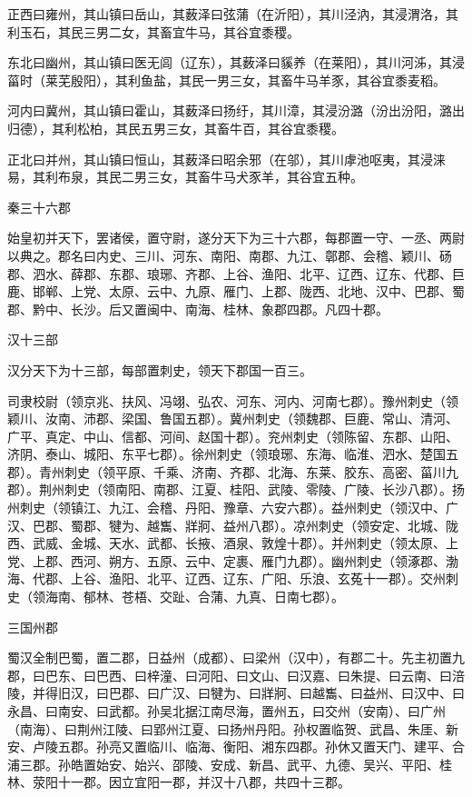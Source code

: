 \documentclass[a4paper,12pt,UTF8,twoside]{ctexbook}
\begin{document}
	正西曰雍州，其山镇曰岳山，其薮泽曰弦蒲（在沂阳），其川泾汭，其浸渭洛，其利玉石，其民三男二女，其畜宜牛马，其谷宜黍稷。
	
	东北曰幽州，其山镇曰医无闾（辽东），其薮泽曰貕养（在莱阳），其川河泲，其浸菑时（莱芜殷阳），其利鱼盐，其民一男三女，其畜牛马羊豕，其谷宜黍麦稻。
	
	河内曰冀州，其山镇曰霍山，其薮泽曰扬纡，其川漳，其浸汾潞（汾出汾阳，潞出归德），其利松柏，其民五男三女，其畜牛百，其谷宜黍稷。
	
	正北曰并州，其山镇曰恒山，其薮泽曰昭余邪（在邬），其川虖池呕夷，其浸涞易，其利布泉，其民二男三女，其畜牛马犬豕羊，其谷宜五种。
	
	秦三十六郡
	
	始皇初并天下，罢诸侯，置守尉，遂分天下为三十六郡，每郡置一守、一丞、两尉以典之。郡名曰内史、三川、河东、南阳、南郡、九江、鄣郡、会稽、颖川、砀郡、泗水、薛郡、东郡、琅琊、齐郡、上谷、渔阳、北平、辽西、辽东、代郡、巨鹿、邯郸、上党、太原、云中、九原、雁门、上郡、陇西、北地、汉中、巴郡、蜀郡、黔中、长沙。后又置闽中、南海、桂林、象郡四郡。凡四十郡。
	
	汉十三部
	
	汉分天下为十三部，每部置刺史，领天下郡国一百三。
	
	司隶校尉（领京兆、扶风、冯翊、弘农、河东、河内、河南七郡）。豫州刺史（领颖川、汝南、沛郡、梁国、鲁国五郡）。冀州刺史（领魏郡、巨鹿、常山、清河、广平、真定、中山、信都、河间、赵国十郡）。兖州刺史（领陈留、东郡、山阳、济阴、泰山、城阳、东平七郡）。徐州刺史（领琅琊、东海、临淮、泗水、楚国五郡）。青州刺史（领平原、千乘、济南、齐郡、北海、东莱、胶东、高密、菑川九郡）。荆州刺史（领南阳、南郡、江夏、桂阳、武陵、零陵、广陵、长沙八郡）。扬州刺史（领镇江、九江、会稽、丹阳、豫章、六安六郡）。益州刺史（领汉中、广汉、巴郡、蜀郡、犍为、越雟、牂牁、益州八郡）。凉州刺史（领安定、北城、陇西、武威、金城、天水、武都、长掖、酒泉、敦煌十郡）。并州刺史（领太原、上党、上郡、西河、朔方、五原、云中、定裹、雁门九郡）。幽州刺史（领涿郡、渤海、代郡、上谷、渔阳、北平、辽西、辽东、广阳、乐浪、玄菟十一郡）。交州刺史（领海南、郁林、苍梧、交趾、合蒲、九真、日南七郡）。
	
	三国州郡
	
	蜀汉全制巴蜀，置二郡，日益州（成都）、曰梁州（汉中），有郡二十。先主初置九郡，曰巴东、曰巴西、曰梓潼、曰河阳、曰文山、曰汉嘉、曰朱提、曰云南、曰涪陵，并得旧汉，曰巴郡、曰广汉、曰犍为、曰牂牁、曰越雟、曰益州、曰汉中、曰永昌、曰南安、曰武都。孙吴北据江南尽海，置州五，曰交州（安南）、曰广州（南海）、曰荆州江陵、曰郢州江夏、曰扬州丹阳。孙权置临贺、武昌、朱厓、新安、卢陵五郡。孙亮又置临川、临海、衡阳、湘东四郡。孙休又置天门、建平、合浦三郡。孙皓置始安、始兴、邵陵、安成、新昌、武平、九德、吴兴、平阳、桂林、荥阳十一郡。因立宜阳一郡，并汉十八郡，共四十三郡。
	
\end{document}
